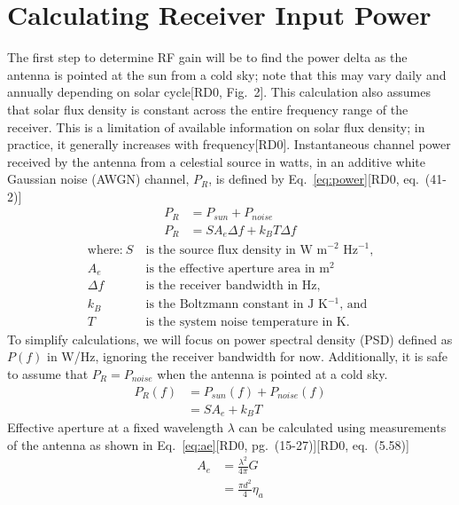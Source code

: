 \documentclass[titlepage]{article}
\newcommand{\nraocite}[1]{[RD0\cite{#1}]}
\newcommand{\nraoprecite}[2][]{[RD0\cite{#2}{, #1}]}
\begin{document}
\section{Calculating Receiver Input Power}
The first step to determine RF gain will be to find the power delta as the antenna is pointed at the sun from a cold sky; note that this may vary daily and annually depending on solar cycle\nraoprecite[Fig.~2]{solartemp}. This calculation also assumes that solar flux density is constant across the entire frequency range of the receiver. This is a limitation of available information on solar flux density; in practice, it generally increases with frequency\nraocite{sfd1986}. Instantaneous channel power received by the antenna from a celestial source in watts, in an additive white Gaussian noise (AWGN) channel, $P_R$, is defined by Eq.~\ref{eq:power}\nraoprecite[eq.~(41-2)]{aeh}
\begin{align} \label{eq:power}
    P_{R} &= P_{sun} + P_{noise} \\
    P_{R} &= S A_e \Delta f + k_B T \Delta f \nonumber
\end{align}
\begin{align*}
    \text{where:}~S ~&\text{is the source flux density in W m$^{-2}$ Hz$^{-1}$,}\\
    A_e             ~&\text{is the effective aperture area in m$^2$}\\
    \Delta f        ~&\text{is the receiver bandwidth in Hz,}\\
    k_B             ~&\text{is the Boltzmann constant in J K$^{-1}$, and}\\
    T               ~&\text{is the system noise temperature in K.}
\end{align*}
To simplify calculations, we will focus on power spectral density (PSD) defined as $P(f)$ in W/Hz, ignoring the receiver bandwidth for now. Additionally, it is safe to assume that $P_R = P_{noise}$ when the antenna is pointed at a cold sky.
\begin{align} \label{eq:psd}
    P_{R}(f) &= P_{sun}(f) + P_{noise}(f) \\
             &= S A_e + k_B T \nonumber
\end{align}
Effective aperture at a fixed wavelength $\lambda$ can be calculated using measurements of the antenna as shown in Eq.~\ref{eq:ae}\nraoprecite[pg.~(15-27)]{aeh}\nraoprecite[eq.~(5.58)]{tora}
\begin{align} \label{eq:ae}
    A_e &= \frac{\lambda^2}{4\pi}G \\
    &= \frac{\pi d^2}{4} \eta_a \nonumber
\end{align}
\end{document}
